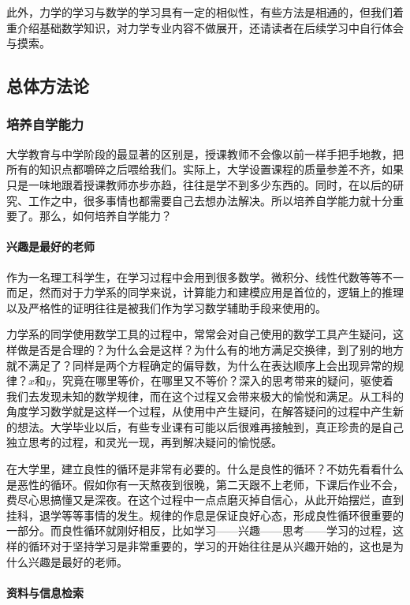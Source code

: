 此外，力学的学习与数学的学习具有一定的相似性，有些方法是相通的，但我们着重介绍基础数学知识，对力学专业内容不做展开，还请读者在后续学习中自行体会与摸索。

\subsection{总体方法论}

\subsubsection{培养自学能力}

大学教育与中学阶段的最显著的区别是，授课教师不会像以前一样手把手地教，把所有的知识点都嚼碎之后喂给我们。实际上，大学设置课程的质量参差不齐，如果只是一味地跟着授课教师亦步亦趋，往往是学不到多少东西的。同时，在以后的研究、工作之中，很多事情也都需要自己去想办法解决。所以培养自学能力就十分重要了。那么，如何培养自学能力？

\paragraph{兴趣是最好的老师}

作为一名理工科学生，在学习过程中会用到很多数学。微积分、线性代数等等不一而足，然而对于力学系的同学来说，计算能力和建模应用是首位的，逻辑上的推理以及严格性的证明往往是被我们作为学习数学辅助手段来使用的。

力学系的同学使用数学工具的过程中，常常会对自己使用的数学工具产生疑问，这样做是否是合理的？为什么会是这样？为什么有的地方满足交换律，到了别的地方就不满足了？同样是两个方程确定的偏导数，为什么在表达顺序上会出现异常的规律？$x$和$y$，究竟在哪里等价，在哪里又不等价？深入的思考带来的疑问，驱使着我们去发现未知的数学规律，而在这个过程又会带来极大的愉悦和满足。从工科的角度学习数学就是这样一个过程，从使用中产生疑问，在解答疑问的过程中产生新的想法。大学毕业以后，有些专业课有可能以后很难再接触到，真正珍贵的是自己独立思考的过程，和灵光一现，再到解决疑问的愉悦感。

在大学里，建立良性的循环是非常有必要的。什么是良性的循环？不妨先看看什么是恶性的循环。假如你有一天熬夜到很晚，第二天跟不上老师，下课后作业不会，费尽心思搞懂又是深夜。在这个过程中一点点磨灭掉自信心，从此开始摆烂，直到挂科，退学等等事情的发生。规律的作息是保证良好心态，形成良性循环很重要的一部分。而良性循环就刚好相反，比如学习——兴趣——思考——学习的过程，这样的循环对于坚持学习是非常重要的，学习的开始往往是从兴趣开始的，这也是为什么兴趣是最好的老师。

\paragraph{资料与信息检索}

